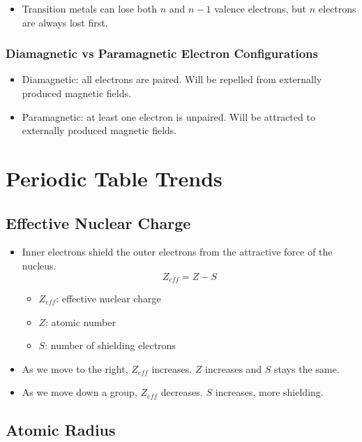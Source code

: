 \documentclass{article}
\begin{document}
\begin{itemize}
    \item Transition metals can lose both $n$ and $n-1$ valence electrons, but $n$ electrons are always lost first.
\end{itemize}

\subsubsection{Diamagnetic vs Paramagnetic Electron Configurations}

\begin{itemize}
    \item Diamagnetic: all electrons are paired. Will be repelled from externally produced magnetic fields.
    \item Paramagnetic: at least one electron is unpaired. Will be attracted to externally produced magnetic fields.
\end{itemize}

\section{Periodic Table Trends}

\subsection{Effective Nuclear Charge}

\begin{itemize}
    \item Inner electrons shield the outer electrons from the attractive force of the nucleus.
    \[Z_{eff} = Z - S\]
    \begin{itemize}
        \item $Z_{eff}$: effective nuclear charge
        \item $Z$: atomic number
        \item $S$: number of shielding electrons 
    \end{itemize}
    \item As we move to the right, $Z_{eff}$ increases. $Z$ increases and $S$ stays the same.
    \item As we move down a group, $Z_{eff}$ decreases. $S$ increases, more shielding.
\end{itemize}

\subsection{Atomic Radius}
\end{document}
